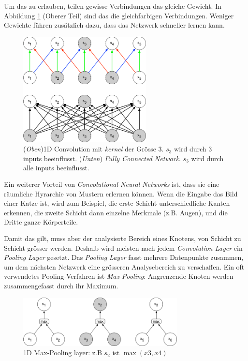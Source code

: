Um das zu erlauben, teilen gewisse Verbindungen das gleiche Gewicht. In Abbildung \ref{img:conv} (Oberer Teil) sind das die gleichfarbigen Verbindungen. Weniger Gewichte führen zusätzlich dazu, dass das Netzwerk schneller lernen kann.
\begin{figure}[hbt]
	\centering
		\includegraphics[width=0.6\textwidth]{assets/conv_1d.png}
	\caption{(\textit{Oben})1D Convolution mit \textit{kernel} der Grösse 3. $s_3$ wird durch 3 inputs beeinflusst.
		     (\textit{Unten}) \textit{Fully Connected Network}. $s_3$ wird durch alle inputs beeinflusst.\parencite{goodfellow}}
	\label{img:conv}
\end{figure}

Ein weiterer Vorteil von \textit{Convolutional Neural Networks} ist, dass sie eine räumliche Hyrarchie von Mustern erlernen können. Wenn die Eingabe das Bild einer Katze ist, wird zum Beispiel, die erste Schicht unterschiedliche Kanten erkennen, die zweite Schicht dann einzelne Merkmale (z.B. Augen), und die Dritte ganze Körperteile.

Damit das gilt, muss aber der analysierte Bereich eines Knotens, von Schicht zu Schicht grösser werden. Deshalb wird meisten nach jedem \textit{Convolution Layer} ein \textit{Pooling Layer} gesetzt. Das \textit{Pooling Layer} fasst mehrere Datenpunkte zusammen, um dem nächsten Netzwerk eine grösseren Analysebereich zu verschaffen. Ein oft verwendetes Pooling-Verfahren ist \textit{Max-Pooling}: Angrenzende Knoten werden zusammengefasst durch ihr Maximum. 
\begin{figure}[hbt]
	\centering
		\includegraphics[width=0.75\textwidth]{assets/pooling_1d.png}
	\caption{1D Max-Pooling layer: z.B $s_2$ ist $\max (x3, x4)$}
	\label{img:pool}
\end{figure}


